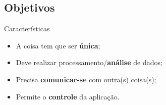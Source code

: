 \subsection*{Objetivos}
\begin{frame}{}
	\begin{block}{Características}	
		\begin{itemize}
			\item A coisa tem que ser \textbf{única};
			\item Deve realizar processamento/\textbf{análise} de dados;
			\item Precisa \textbf{comunicar-se} com outra(s) coisa(s);
			\item Permite o \textbf{controle} da aplicação. %
		\end{itemize}
	\end{block}
\end{frame}